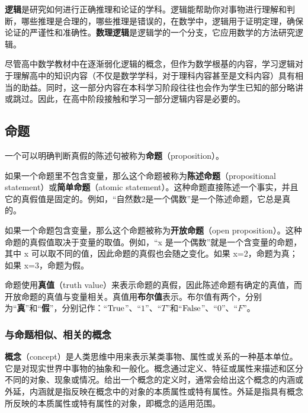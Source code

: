 
\begin{issues}
\issueDraft
\end{issues}

\textbf{逻辑}是研究如何进行正确推理和论证的学科。逻辑能帮助你对事物进行理解和判断，哪些推理是合理的，哪些推理是错误的，在数学中，逻辑用于证明定理，确保论证的严谨性和准确性。\textbf{数理逻辑}是逻辑学的一个分支，它应用数学的方法研究逻辑。

尽管高中数学教材中在逐渐弱化逻辑的概念，但作为数学根基的内容，学习逻辑对于理解高中的知识内容（不仅是数学学科，对于理科内容甚至是文科内容）具有相当的助益。同时，这一部分内容在本科学习阶段往往也会作为学生已知的部分略讲或跳过。因此，在高中阶段接触和学习一部分逻辑内容是必要的。




\subsection{命题}

一个可以明确判断真假的陈述句被称为\textbf{命题}（proposition）。

如果一个命题里不包含变量，那么这个命题被称为\textbf{陈述命题}（propositional statement）或\textbf{简单命题}（atomic statement）。这种命题直接陈述一个事实，并且它的真假值是固定的。例如，“自然数2是一个偶数”是一个陈述命题，它总是真的。

如果一个命题包含变量，那么这个命题被称为\textbf{开放命题}（open proposition）。这种命题的真假值取决于变量的取值。例如，“x 是一个偶数”就是一个含变量的命题，其中 x 可以取不同的值，因此命题的真假也会随之变化。如果 x=2，命题为真；如果 x=3，命题为假。

命题使用\textbf{真值}（truth value）来表示命题的真假，因此陈述命题有确定的真值，而开放命题的真值与变量相关。真值用\textbf{布尔值}表示。布尔值有两个，分别为“\textbf{真}”和“\textbf{假}”，分别记作：“${\rm True}$”、“$1$”、“$T$”和“${\rm False}$”、“$0$”、“$F$”。

\subsubsection{与命题相似、相关的概念}

\textbf{概念}（concept）是人类思维中用来表示某类事物、属性或关系的一种基本单位。它是对现实世界中事物的抽象和一般化。概念通过定义、特征或属性来描述和区分不同的对象、现象或情况。给出一个概念的定义时，通常会给出这个概念的内涵或外延，内涵就是指反映在概念中的对象的本质属性或特有属性。外延是指具有概念所反映的本质属性或特有属性的对象，即概念的适用范围。

